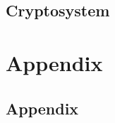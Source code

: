 \documentclass{report}
\theoremstyle{break}
\begin{document}
		\chapter{Cryptosystem}
			
	
	\part{Appendix}
		\chapter{Appendix}
			
\end{document}
